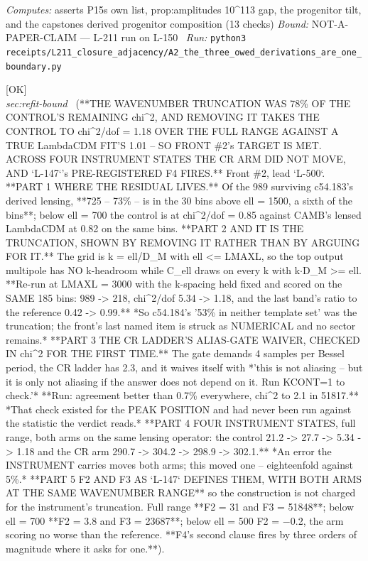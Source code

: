 \begin{description}
\emph{Computes:} asserts P15s own list, prop:amplitudes 10\textasciicircum{}113 gap, the progenitor tilt, and the capstones derived progenitor composition (13 checks)
 \emph{Bound:} NOT-A-PAPER-CLAIM --- L-211 run on L-150
\ \emph{Run:} \texttt{python3 receipts/L211\_closure\_adjacency/A2\_the\_three\_owed\_derivations\_are\_one\_boundary.py}
\item[\rcptlabel{P15_the_control_entered_the_regime_and_the_arm_did_not_move}{P15R90}\textbf{P15R90}\quad\texttt{P15\_the\_control\_entered\_the\_regime\_and\_the\_arm\_did\_not\_move}]\hfill\textsf{[OK]}\\
\textit{sec:refit-bound} \ (**THE WAVENUMBER TRUNCATION WAS 78\% OF THE CONTROL'S REMAINING chi\textasciicircum{}2, AND REMOVING IT TAKES THE CONTROL TO chi\textasciicircum{}2/dof = 1.18 OVER THE FULL RANGE AGAINST A TRUE LambdaCDM FIT'S 1.01 -- SO FRONT \#2's TARGET IS MET. ACROSS FOUR INSTRUMENT STATES THE CR ARM DID NOT MOVE, AND `L-147`'s PRE-REGISTERED F4 FIRES.** Front \#2, lead `L-500`. **PART 1 WHERE THE RESIDUAL LIVES.** Of the 989 surviving c54.183's derived lensing, **725 -- 73\% -- is in the 30 bins above ell = 1500, a sixth of the bins**; below ell = 700 the control is at chi\textasciicircum{}2/dof = 0.85 against CAMB's lensed LambdaCDM at 0.82 on the same bins. **PART 2 AND IT IS THE TRUNCATION, SHOWN BY REMOVING IT RATHER THAN BY ARGUING FOR IT.** The grid is k = ell/D\_M with ell <= LMAXL, so the top output multipole has NO k-headroom while C\_ell draws on every k with k\ensuremath{\cdot}D\_M >= ell. **Re-run at LMAXL = 3000 with the k-spacing held fixed and scored on the SAME 185 bins: 989 -> 218, chi\textasciicircum{}2/dof 5.34 -> 1.18, and the last band's ratio to the reference 0.42 -> 0.99.** *So c54.184's '53\% in neither template set' was the truncation; the front's last named item is struck as NUMERICAL and no sector remains.* **PART 3 THE CR LADDER'S ALIAS-GATE WAIVER, CHECKED IN chi\textasciicircum{}2 FOR THE FIRST TIME.** The gate demands 4 samples per Bessel period, the CR ladder has 2.3, and it waives itself with *'this is not aliasing -- but it is only not aliasing if the answer does not depend on it. Run KCONT=1 to check.'* **Run: agreement better than 0.7\% everywhere, chi\textasciicircum{}2 to 2.1 in 51817.** *That check existed for the PEAK POSITION and had never been run against the statistic the verdict reads.* **PART 4 FOUR INSTRUMENT STATES, full range, both arms on the same lensing operator: the control 21.2 -> 27.7 -> 5.34 -> 1.18 and the CR arm 290.7 -> 304.2 -> 298.9 -> 302.1.** *An error the INSTRUMENT carries moves both arms; this moved one -- eighteenfold against 5\%.* **PART 5 F2 AND F3 AS `L-147` DEFINES THEM, WITH BOTH ARMS AT THE SAME WAVENUMBER RANGE** so the construction is not charged for the instrument's truncation. Full range **F2 = 31 and F3 = 51848**; below ell = 700 **F2 = 3.8 and F3 = 23687**; below ell = 500 F2 = \ensuremath{-}0.2, the arm scoring no worse than the reference. **F4's second clause fires by three orders of magnitude where it asks for one.**). 

\end{description}
